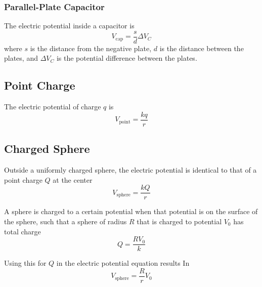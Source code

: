 \documentclass{article}
\begin{document}
\subsubsection*{Parallel-Plate Capacitor}
The electric potential inside a capacitor is
\[V_\text{cap}=\frac{s}{d}\Delta V_C\]
where $s$ is the distance from the negative plate, $d$ is the distance between the plates, and
$\Delta V_C$ is the potential difference between the plates.

\subsection*{Point Charge}
The electric potential of charge $q$ is
\[V_\text{point}=\frac{kq}{r}\]

\subsection*{Charged Sphere}
Outside a uniformly charged sphere, the electric potential is identical to that of a point charge
$Q$ at the center
\[V_\text{sphere}=\frac{kQ}{r}\]

A sphere is charged to a certain potential when that potential is on the surface of the sphere,
such that a sphere of radius $R$ that is charged to potential $V_0$ has total charge
\[Q=\frac{RV_0}{k}\]

Using this for $Q$ in the electric potential equation results In
\[V_\text{sphere}=\frac{R}{r}V_0\]
\end{document}

